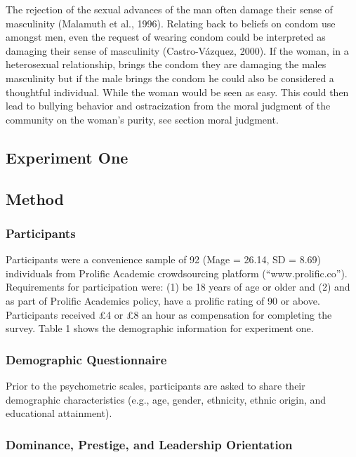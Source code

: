 \documentclass[
  donotrepeattitle,doc, 12pt, a4paper,floatsintext]{apa7}
\begin{document}
The rejection of the sexual advances of the man often damage their sense of masculinity (Malamuth et al., 1996). Relating back to beliefs on condom use amongst men, even the request of wearing condom could be interpreted as damaging their sense of masculinity (Castro-Vázquez, 2000). If the woman, in a heterosexual relationship, brings the condom they are damaging the males masculinity but if the male brings the condom he could also be considered a thoughtful individual. While the woman would be seen as easy. This could then lead to bullying behavior and ostracization from the moral judgment of the community on the woman's purity, see section moral judgment.

\hypertarget{experiment-one}{%
\subsection{Experiment One}\label{experiment-one}}

\hypertarget{method}{%
\subsection{Method}\label{method}}

\hypertarget{participants}{%
\subsubsection{Participants}\label{participants}}

Participants were a convenience sample of 92 (Mage = 26.14, SD = 8.69) individuals from Prolific Academic crowdsourcing platform (``www.prolific.co''). Requirements for participation were: (1) be 18 years of age or older and (2) and as part of Prolific Academics policy, have a prolific rating of 90 or above. Participants received £4 or £8 an hour as compensation for completing the survey. Table 1 shows the demographic information for experiment one.

\hypertarget{demographic-questionnaire}{%
\subsubsection{Demographic Questionnaire}\label{demographic-questionnaire}}

Prior to the psychometric scales, participants are asked to share their demographic characteristics (e.g., age, gender, ethnicity, ethnic origin, and educational attainment).

\hypertarget{dominance-prestige-and-leadership-orientation}{%
\subsubsection{Dominance, Prestige, and Leadership Orientation}\label{dominance-prestige-and-leadership-orientation}}
\end{document}
